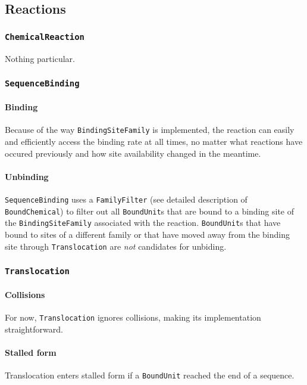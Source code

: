 
\subsection{Reactions}

\subsubsection{\texttt{ChemicalReaction}}

Nothing particular.

\subsubsection{\texttt{SequenceBinding}}

\paragraph{Binding} Because of the way \texttt{BindingSiteFamily} is implemented, the reaction can easily and efficiently access the binding rate at all times, no matter what reactions have occured previously and how site availability changed in the meantime.

\paragraph{Unbinding} \texttt{SequenceBinding} uses a \texttt{FamilyFilter} (see detailed description of \texttt{BoundChemical}) to filter out all \texttt{BoundUnit}s that are bound to a binding site of the \texttt{BindingSiteFamily} associated with the reaction. \texttt{BoundUnit}s that have bound to sites of a different family or that have moved away from the binding site through \texttt{Translocation} are \emph{not} candidates for unbiding.

\subsubsection{\texttt{Translocation}}

\paragraph{Collisions} For now, \texttt{Translocation} ignores collisions, making its implementation straightforward.

\paragraph{Stalled form} Translocation enters stalled form if a \texttt{BoundUnit} reached the end of a sequence.

